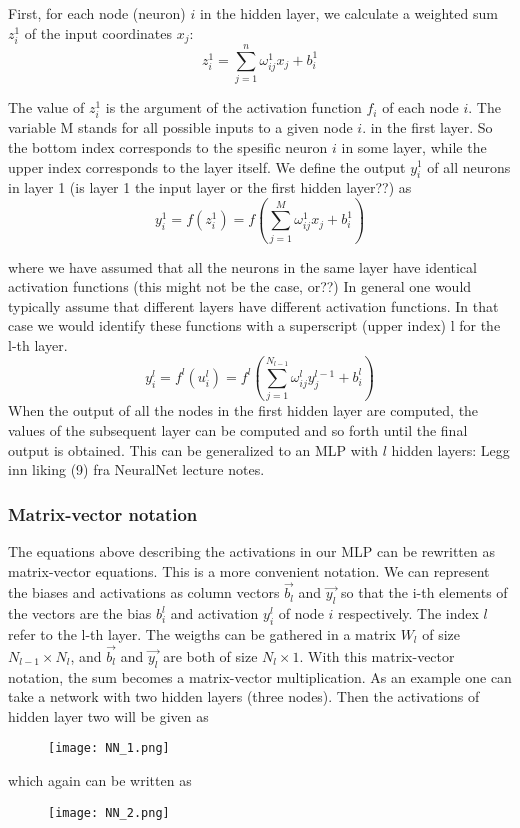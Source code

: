 \documentclass[a4paper,12pt]{article}
\begin{document}
First, for each node (neuron) $i$ in the hidden layer, we calculate a weighted sum $z_i^1$ of the input coordinates $x_j$:
\begin{equation}
    z_i^1 = \sum_{j=1}^n \omega_{ij}^1 x_j + b_i^1
\end{equation}

The value of $z_i^1$ is the argument of the activation function $f_i$ of each node $i$. The variable M stands for all possible inputs to a given node $i$. in the first layer. So the bottom index corresponds to the spesific neuron $i$ in some layer, while the upper index corresponds to the layer itself. We define the output $y_i^1$ of all neurons in layer 1 (is layer 1 the input layer or the first hidden layer??) as
\begin{equation}
    y_i^1 = f(z_i^1) = f( \sum_{j=1}^M \omega_{ij}^1 x_j + b_i^1 )
\end{equation}

where we have assumed that all the neurons in the same layer have identical activation functions (this might not be the case, or??) In general one would typically assume that different layers have different activation functions. In that case we would identify these functions with a superscript (upper index) l for the l-th layer.
\begin{equation}
    y_i^l = f^l(u_i^l) = f^l( \sum_{j=1}^{N_{l-1}} \omega_{ij}^l y_j^{l-1} + b_i^l )
\end{equation}
When the output of all the nodes in the first hidden layer are computed, the values of the subsequent layer can be computed and so forth until the final output is obtained.\newline
This can be generalized to an MLP with $l$ hidden layers:
Legg inn liking (9) fra NeuralNet lecture notes.

\subsubsection{Matrix-vector notation}
The equations above describing the activations in our MLP can be rewritten as matrix-vector equations. This is a more convenient notation.\newline
We can represent the biases and activations as column vectors $\Vec{b_l}$ and $\Vec{y_l}$ so that the i-th elements of the vectors are the bias $b_i^l$ and activation $y_i^l$ of node $i$ respectively. The index $l$ refer to the l-th layer.\newline
The weigths can be gathered in a matrix $W_l$ of size $N_{l-1} \times N_l$, and $\Vec{b_l}$ and $\Vec{y_l}$ are both of size $N_l \times 1$. With this matrix-vector notation, the sum becomes a matrix-vector multiplication. As an example one can take a network with two hidden layers (three nodes). Then the activations of hidden layer two will be given as
\begin{figure}[h!]
  \centering
  \texttt{[image: NN\_1.png]}
\end{figure}
which again can be written as
\begin{figure}[h!]
  \centering
  \texttt{[image: NN\_2.png]}
\end{figure}
\end{document}
